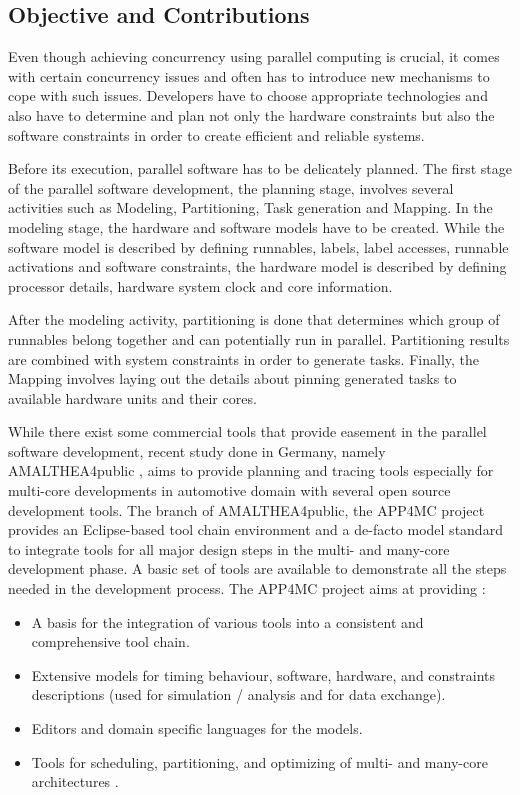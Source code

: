 \subsection{Objective and Contributions}
Even though achieving concurrency using parallel computing is crucial, it comes with certain concurrency issues and often has to introduce new mechanisms to cope with such issues.
Developers have to choose appropriate technologies and also have to determine and plan not only the hardware constraints but also the software constraints in order to create efficient and reliable systems.

Before its execution, parallel software has to be delicately planned. The first stage of the parallel software development, the planning stage, involves several activities such as Modeling, Partitioning, Task generation and Mapping. In the modeling stage, the hardware and software models have to be created. While the software model is described by defining runnables, labels, label accesses, runnable activations and software constraints, the hardware model is described by defining processor details, hardware system clock and core information.

After the modeling activity, partitioning is done that determines which group of runnables belong together and can potentially run in parallel. Partitioning results are combined with system constraints in order to generate tasks. Finally, the Mapping involves laying out the details about pinning generated tasks to available hardware units and their cores.

While there exist some commercial tools that provide easement in the parallel software development, recent study done in Germany, namely AMALTHEA4public \cite{ICPDSSE} \cite{amalthea4publicweb}, aims to provide planning and tracing tools especially for multi-core developments in automotive domain with several open source development tools. The branch of AMALTHEA4public, the APP4MC project \cite{app4mcproposaleclipse} provides an Eclipse-based tool chain environment and a de-facto model standard to integrate tools for all major design steps in the multi- and many-core development phase. A basic set of tools are available to demonstrate all the steps needed in the development process. The APP4MC project aims at providing \cite{app4mcproposaleclipse}:

\begin{itemize}
	\item A basis for the integration of various tools into a consistent and comprehensive tool chain.
	\item Extensive models for timing behaviour, software, hardware, and constraints descriptions (used for simulation / analysis and for data exchange).
	\item Editors and domain specific languages for the models.
	\item Tools for scheduling, partitioning, and optimizing of multi- and many-core architectures \cite{app4mcproposaleclipse}.
\end{itemize}

